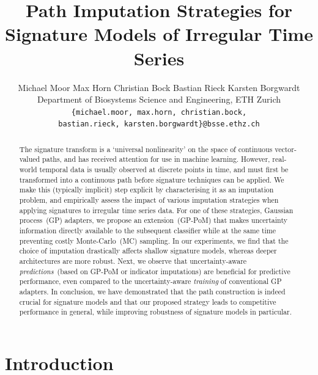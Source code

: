 \documentclass{article}
\title{Path Imputation Strategies for Signature Models of Irregular Time Series}
\author{
    Michael Moor
    \And
	Max Horn
	\And
	Christian Bock
	\And
	Bastian Rieck
	\And
	Karsten Borgwardt
	\AND \\[-12pt]
	Department of Biosystems Science and Engineering, ETH Zurich
	\\
	\hspace{-6.5em}\texttt{\{michael.moor, max.horn, christian.bock,}
	\\
	\hspace{6.5em}\texttt{bastian.rieck, karsten.borgwardt\}@\hspace{0.1pt}bsse.ethz.ch}
} %
\begin{document}
\maketitle

\begin{abstract}
The signature transform is a `universal nonlinearity' on the space of
continuous vector-valued paths, and has received attention for use in
machine learning. However, real-world temporal data is usually observed at discrete points in time, and must first be transformed into a continuous path before
signature techniques can be applied. We make this (typically implicit) step explicit by characterising it as an imputation
problem, and empirically assess the impact of various imputation strategies when
applying signatures to irregular time series data. For one of these
strategies, Gaussian process~(GP) adapters, we propose an
extension~(GP-PoM) that makes uncertainty information directly available
to the subsequent classifier while at the same time preventing costly
Monte-Carlo~(MC) sampling. In our experiments, we find that the choice
of imputation  drastically affects shallow signature models, whereas
deeper architectures are more robust. Next, we observe that
uncertainty-aware \emph{predictions}~(based on GP-PoM or indicator
imputations) are beneficial for predictive performance, even compared to
the uncertainty-aware \emph{training} of conventional GP adapters.
%
In conclusion, we have demonstrated that the path construction is indeed
crucial for signature models and that our proposed strategy leads to
competitive performance in general, while improving robustness of
signature models in particular.
\end{abstract} %

\section{Introduction}
\end{document}
